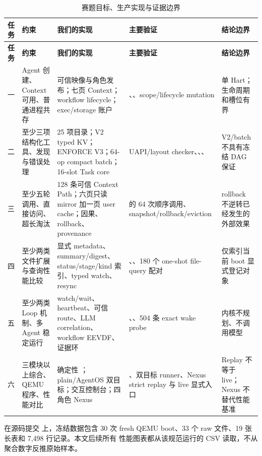 \small
\begin{longtable}{@{}L{0.8cm} L{2.4cm} L{4.2cm} L{3.5cm} L{2.0cm}@{}}
\caption{赛题目标、生产实现与证据边界}\label{tab:goal-evidence}\\
\toprule
\textbf{任务} & \textbf{约束} & \textbf{我们的实现} & \textbf{主要验证} & \textbf{结论边界} \\
\midrule
\endfirsthead
\toprule
\textbf{任务} & \textbf{约束} & \textbf{我们的实现} & \textbf{主要验证} & \textbf{结论边界} \\
\midrule
\endhead
一 & Agent 创建、Context 可用、普通进程共存 &
可信映像与角色发布；七页 Context；workflow lifecycle；exec/storage 账户 &
、、scope/lifecycle mutation &
单 Hart；生命周期和槽位有界 \\
\addlinespace
二 & 至少三项结构化工具、发现与错误处理 &
25 项目录；V2 typed KV；ENFORCE V3；64-op compact batch；16-slot Task core &
UAPI/layout checker、、、 &
V2/batch 不具有冻结 DAG 保证 \\
\addlinespace
三 & 至少五轮调用、直接访问、超长淘汰 &
128 条可信 Context Path；六页只读 mirror 加一页 user cache；因果、rollback、provenance &
 的 64 次顺序调用、snapshot/rollback/eviction &
rollback 不逆转已经发生的外部效果 \\
\addlinespace
四 & 至少两类文件扩展与查询性能比较 &
显式 metadata、summary/digest、status/stage/kind 索引、typed watch、resync &
、、180 个 one-shot file-query 配对 &
仅索引当前 boot 显式登记对象 \\
\addlinespace
五 & 至少两类 Loop 机制、多 Agent 稳定运行 &
watch/wait、heartbeat、可信 route、LLM correlation、workflow EEVDF、证据环 &
、、504 条 exact wake probe &
内核不规划、不调用模型 \\
\addlinespace
六 & 三模块以上综合、QEMU 程序、性能对比 &
确定性 ；plain/AgentOS 双目标；交互控制台；四角色 Nexus &
、双目标 runner、Nexus strict replay 与 live 显式入口 &
Replay 不等于 live；Nexus 不替代性能基准 \\
\bottomrule
\end{longtable}
\normalsize

\begin{evidencebox}[核心实测快照]
在源码提交  上，冻结数据包含
30 次 fresh QEMU boot、33 个 raw 文件、19 张长表和 7,498 行记录。本文后续所有
性能图表都从该规范运行的 CSV 读取，不从聚合数字反推原始样本。
\end{evidencebox}

\cleardoublepage
